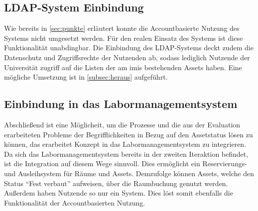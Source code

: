 \subsection{LDAP-System Einbindung}
Wie bereits in \ref{sec:punkte} erläutert konnte die Accountbasierte Nutzung des Systems nicht
umgesetzt werden. Für den realen Einsatz des Systems ist diese Funktionalität unabdingbar. Die
Einbindung des  LDAP-Systems deckt zudem die Datenschutz und Zugriffsrechte der Nutzenden ab, sodass
lediglich Nutzende der Universität zugriff auf die Listen der am \ac{imis} bestehenden Assets haben.
Eine mögliche Umsetzung ist in \ref{subsec:heraus} aufgeführt. 

\subsection{Einbindung in das Labormanagementsystem}
Abschließend ist eine Möglicheit, um die Prozesse und die aus der Evaluation erarbeiteten Probleme
der Begrifflichkeiten in Bezug auf den Assetstatus lösen zu können, das erarbeitet Konzept in das
Labormanagementsystem zu  integrieren. Da sich das Labormanagementsystem
bereits in der zweiten Iteraktion befindet, ist die Integration auf diesem Wege sinnvoll. Dies
ermöglicht ein Reservierungs- und Ausleihsystem für Räume und Assets. Demzufolge können Assets,
welche den Status \enquote{Fest verbaut} aufweisen, über die Raumbuchung genutzt werden. Außerdem
haben Nutzende so nur ein System. Dies löst somit ebenfalls die Funktionalität der Accountbasierten
Nutzung.


